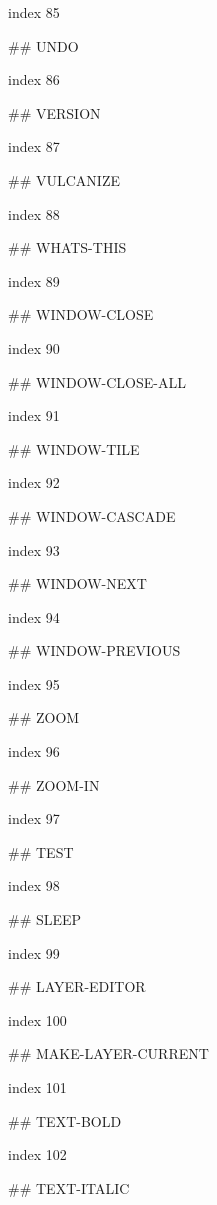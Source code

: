  index 85



## UNDO

 index 86



## VERSION

index 87



## VULCANIZE

index 88



## WHATS-THIS

index 89



## WINDOW-CLOSE

index 90



## WINDOW-CLOSE-ALL

index 91



## WINDOW-TILE

index 92



## WINDOW-CASCADE

index 93



## WINDOW-NEXT

index 94



## WINDOW-PREVIOUS

index 95



## ZOOM

 index 96



## ZOOM-IN

index 97



## TEST

 index 98



## SLEEP

index 99



## LAYER-EDITOR

index 100



## MAKE-LAYER-CURRENT

index 101



## TEXT-BOLD

index 102



## TEXT-ITALIC

